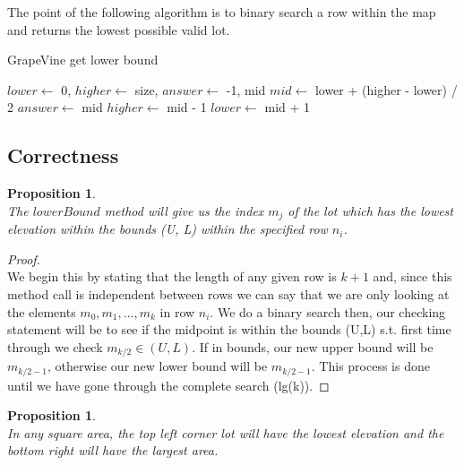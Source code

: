 \documentclass[12pt]{article}
\newtheorem{proposition}[theorem]{Proposition}
\begin{document}
\newpage

The point of the following algorithm is to binary search a row within
the map and returns the lowest possible valid lot.

\begin{algorithm}[H]
\caption{GrapeVine get lower bound}
\begin{algorithmic}
        \State $lower \gets$ 0, $higher \gets$ size, $answer \gets$ -1, mid
            \State $mid \gets$ lower + (higher - lower) / 2
                \State $answer \gets$ mid
                \State $higher \gets$ mid - 1
            \Else
                \State $lower \gets$ mid + 1
            \EndIf
        \EndWhile
    \EndProcedure
\end{algorithmic}
\end{algorithm}


\subsection{Correctness}
\begin{proposition}
~ \\ \indent The $lowerBound$ method will give us the index $m_j$ of the lot which has the lowest elevation within the bounds (U, L)
within the specified row $n_i$.
\end{proposition}

\begin{proof}
~ \\ \indent We begin this by stating that the length of any given row is $k+1$ and, since this method call is independent between
rows we can say that we are only looking at the elements $m_0, m_1, ..., m_k$ in row $n_i$. We do a binary search then,
our checking statement will be to see if the midpoint is within the bounds (U,L) s.t. first time through we check
$m_{k/2} \in (U,L)$. If in bounds, our new upper bound will be $m_{k/2-1}$, otherwise our new lower bound will be
$m_{k/2-1}$. This process is done until we have gone through the complete search (lg(k)).
\end{proof}

\begin{proposition}
~ \\ \indent In any square area, the top left corner lot will have the lowest elevation and the bottom right will have
the largest area.
\end{proposition}
\end{document}

